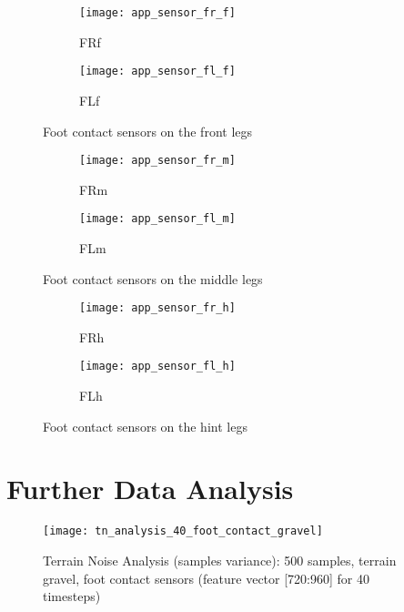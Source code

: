 \begin{figure}[H]
\centering
\begin{subfigure}{0.48\textwidth}
  \centering
  \texttt{[image: app\_sensor\_fr\_f]}
  \caption{FRf}
  \label{fig:app_fr_f}
\end{subfigure}
\begin{subfigure}{0.48\textwidth}
  \centering
  \texttt{[image: app\_sensor\_fl\_f]}
  \caption{FLf}
  \label{fig:app_fl_f}
\end{subfigure}
\caption{Foot contact sensors on the front legs}
\label{fig:app_f_f}
\end{figure}

\begin{figure}[H]
\centering
\begin{subfigure}{0.48\textwidth}
  \centering
  \texttt{[image: app\_sensor\_fr\_m]}
  \caption{FRm}
  \label{fig:app_fr_m}
\end{subfigure}
\begin{subfigure}{0.48\textwidth}
  \centering
  \texttt{[image: app\_sensor\_fl\_m]}
  \caption{FLm}
  \label{fig:app_fl_m}
\end{subfigure}
\caption{Foot contact sensors on the middle legs}
\label{fig:app_f_m}
\end{figure}

\begin{figure}[H]
\centering
\begin{subfigure}{0.48\textwidth}
  \centering
  \texttt{[image: app\_sensor\_fr\_h]}
  \caption{FRh}
  \label{fig:app_fr_h}
\end{subfigure}
\begin{subfigure}{0.48\textwidth}
  \centering
  \texttt{[image: app\_sensor\_fl\_h]}
  \caption{FLh}
  \label{fig:app_fl_h}
\end{subfigure}
\caption{Foot contact sensors on the hint legs}
\label{fig:app_f_h}
\end{figure}

\section{Further Data Analysis} \label{sec:further_data_analysis}

\begin{figure}[H]
  \centering
  \texttt{[image: tn\_analysis\_40\_foot\_contact\_gravel]}
  \caption{Terrain Noise Analysis (samples variance): 500 samples, terrain gravel, foot contact sensors (feature vector [720:960] for 40 timesteps)}
  \label{fig:tn_analysis_foot_contact_gravel}
\end{figure}

